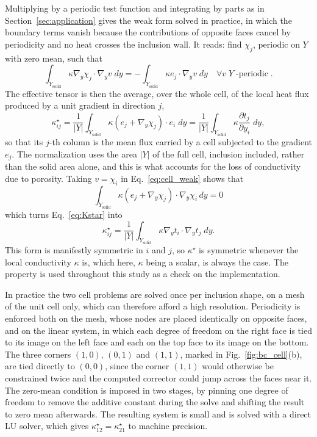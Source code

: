 \documentclass{article}
\newcommand{\tmop}[1]{\ensuremath{\operatorname{#1}}}
\begin{document}
Multiplying by a periodic test function and integrating by parts as in
Section~\ref{sec:application} gives the weak form solved in practice, in which
the boundary terms vanish because the contributions of opposite faces cancel
by periodicity and no heat crosses the inclusion wall. It reads: find $\chi_j$,
periodic on $Y$ with zero mean, such that
\begin{equation}
  \label{eq:cell_weak}
  \int_{Y_{\tmop{solid}}} \kappa \nabla_y \chi_j \cdot \nabla_y v \; dy = -
  \int_{Y_{\tmop{solid}}} \kappa e_j \cdot \nabla_y v \; dy \quad \forall v \;
  Y\tmop{-periodic} .
\end{equation}
The effective tensor is then the average, over the whole cell, of the local
heat flux produced by a unit gradient in direction $j$,
\begin{equation}
  \label{eq:Kstar}
  \kappa^{\star}_{ij} = \frac{1}{| Y |} \int_{Y_{\tmop{solid}}} \kappa \left(
  e_j + \nabla_y \chi_j \right) \cdot e_i \; dy = \frac{1}{| Y |}
  \int_{Y_{\tmop{solid}}} \kappa \frac{\partial t_j}{\partial y_i} \; dy ,
\end{equation}
so that its $j$-th column is the mean flux carried by a cell subjected to the
gradient $e_j$. The normalization uses the area $| Y |$ of the full cell,
inclusion included, rather than the solid area alone, and this is what
accounts for the loss of conductivity due to porosity. Taking $v = \chi_i$ in
Eq.~\eqref{eq:cell_weak} shows that 
$$\int_{Y_{\tmop{solid}}} \kappa (e_j +
\nabla_y \chi_j) \cdot \nabla_y \chi_i \, dy = 0$$ 
which turns
Eq.~\eqref{eq:Kstar} into
\[ \kappa^{\star}_{ij} = \frac{1}{| Y |} \int_{Y_{\tmop{solid}}} \kappa \nabla_y
   t_i \cdot \nabla_y t_j \; dy . \]
This form is manifestly symmetric in $i$ and $j$, so $\kappa^{\star}$ is
symmetric whenever the local conductivity $\kappa$ is, which here, $\kappa$
being a scalar, is always the case. The property is used throughout this study
as a check on the implementation.

In practice the two cell problems are solved once per inclusion shape, on a
mesh of the unit cell only, which can therefore afford a high resolution.
Periodicity is enforced both on the mesh, whose nodes are placed identically on
opposite faces, and on the linear system, in which each degree of freedom on
the right face is tied to its image on the left face and each on the top face
to its image on the bottom. The three corners $(1, 0)$, $(0, 1)$ and $(1, 1)$,
marked in Fig.~\ref{fig:bc_cell}(b),
are tied directly to $(0, 0)$, since the corner $(1, 1)$ would otherwise be
constrained twice and the computed corrector could jump across the faces near
it. The zero-mean condition is imposed in two stages, by pinning one degree of
freedom to remove the additive constant during the solve and shifting the
result to zero mean afterwards. The resulting system is small and is solved
with a direct LU solver, which gives $\kappa^{\star}_{12} = \kappa^{\star}_{21}$
to machine precision.
\end{document}
